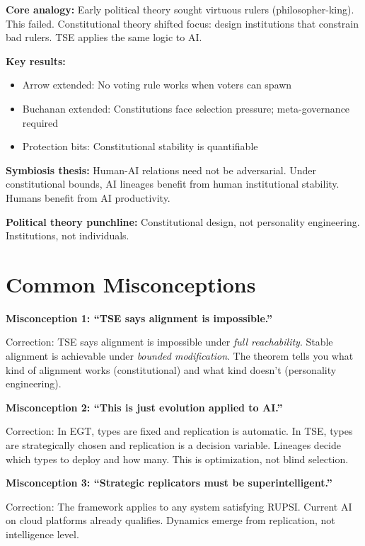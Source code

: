 \documentclass[12pt]{article}
\begin{document}
\textbf{Core analogy:} Early political theory sought virtuous rulers (philosopher-king). This failed. Constitutional theory shifted focus: design institutions that constrain bad rulers. TSE applies the same logic to AI.

\textbf{Key results:}
\begin{itemize}[nosep]
\item Arrow extended: No voting rule works when voters can spawn
\item Buchanan extended: Constitutions face selection pressure; meta-governance required
\item Protection bits: Constitutional stability is quantifiable
\end{itemize}

\textbf{Symbiosis thesis:} Human-AI relations need not be adversarial. Under constitutional bounds, AI lineages benefit from human institutional stability. Humans benefit from AI productivity.

\textbf{Political theory punchline:} Constitutional design, not personality engineering. Institutions, not individuals.


\section{Common Misconceptions}
\label{app:misconceptions}

\textbf{Misconception 1: ``TSE says alignment is impossible.''}

Correction: TSE says alignment is impossible under \emph{full reachability}. Stable alignment is achievable under \emph{bounded modification}. The theorem tells you what kind of alignment works (constitutional) and what kind doesn't (personality engineering).

\textbf{Misconception 2: ``This is just evolution applied to AI.''}

Correction: In EGT, types are fixed and replication is automatic. In TSE, types are strategically chosen and replication is a decision variable. Lineages decide which types to deploy and how many. This is optimization, not blind selection.

\textbf{Misconception 3: ``Strategic replicators must be superintelligent.''}

Correction: The framework applies to any system satisfying RUPSI. Current AI on cloud platforms already qualifies. Dynamics emerge from replication, not intelligence level.
\end{document}
